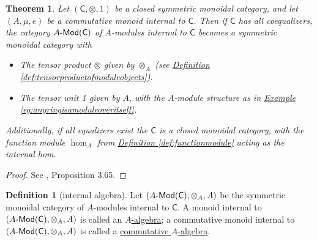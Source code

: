 \documentclass[a4paper,10pt]{scrreprt}
\newcommand{\defn}[1]{\ul{#1}}
\def\mhyp{{\hbox{-}}}
\theoremstyle{definition}
\newtheorem{definition}{Definition}[section]
\theoremstyle{plain}
\newtheorem{theorem}{Theorem}[section]
\theoremstyle{remark}
\begin{document}
\begin{theorem}
  Let $(\mathsf{C}, \otimes, 1)$ be a closed symmetric monoidal category, and let $(A, \mu, e)$ be a commutative monoid internal to $\mathsf{C}$. Then if $\mathsf{C}$ has all coequalizers, the category $A\mhyp\mathsf{Mod}(\mathsf{C})$ of $A$-modules internal to $\mathsf{C}$ becomes a symmetric monoidal category with
  \begin{itemize}
    \item The tensor product $\otimes$ given by $\otimes_{A}$ (see \hyperref[def:tensorproductofmoduleobjects]{Definition \ref*{def:tensorproductofmoduleobjects}}).

    \item The tensor unit 1 given by $A$, with the $A$-module structure as in \hyperref[eg:anyringisamoduleoveritself]{Example \ref*{eg:anyringisamoduleoveritself}}.
  \end{itemize}

  Additionally, if all equalizers exist the $\mathsf{C}$ is a closed monoidal category, with the function module $\hom_{A}$ from \hyperref[def:functionmodule]{Definition \ref*{def:functionmodule}} acting as the internal hom.
\end{theorem}
\begin{proof}
  See \cite{nlab-deligne-theorem}, Proposition 3.65.
\end{proof}

\begin{definition}[internal algebra]
  \label{def:internalalgebra}
  Let $(A\mhyp\mathsf{Mod}(\mathsf{C}), \otimes_{A}, A)$ be the symmetric monoidal category of $A$-modules internal to $\mathsf{C}$. A monoid internal to $(A\mhyp\mathsf{Mod}(\mathsf{C}), \otimes_{A}, A)$ is called an \defn{$A$-algebra}; a commutative monoid internal to $(A\mhyp\mathsf{Mod}(\mathsf{C}), \otimes_{A}, A)$ is called a \defn{commutative $A$-algebra}.
\end{definition}
\end{document}
